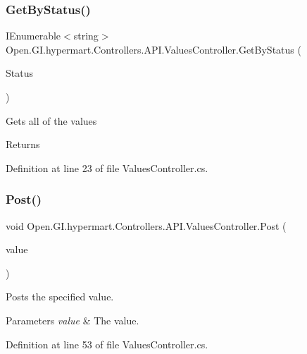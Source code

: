 \subsubsection{Get\+By\+Status()}
{\footnotesize\ttfamily I\+Enumerable$<$string$>$ Open.\+G\+I.\+hypermart.\+Controllers.\+A\+P\+I.\+Values\+Controller.\+Get\+By\+Status (\begin{DoxyParamCaption}\item[{int}]{Status }\end{DoxyParamCaption})}



Gets all of the values 

\begin{DoxyReturn}{Returns}

\end{DoxyReturn}


Definition at line 23 of file Values\+Controller.\+cs.

\mbox{\label{class_open_1_1_g_i_1_1hypermart_1_1_controllers_1_1_a_p_i_1_1_values_controller_a4b0c28944cf2577d0883f17466b45453}} 
\subsubsection{Post()}
{\footnotesize\ttfamily void Open.\+G\+I.\+hypermart.\+Controllers.\+A\+P\+I.\+Values\+Controller.\+Post (\begin{DoxyParamCaption}\item[{[\+From\+Body] string}]{value }\end{DoxyParamCaption})}



Posts the specified value. 


\begin{DoxyParams}{Parameters}
{\em value} & The value.\\
\hline
\end{DoxyParams}


Definition at line 53 of file Values\+Controller.\+cs.

\mbox{\label{class_open_1_1_g_i_1_1hypermart_1_1_controllers_1_1_a_p_i_1_1_values_controller_a1639499e0a18f82e61335c94c344ad31}} 
